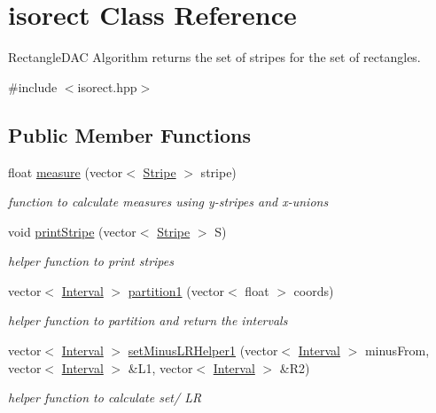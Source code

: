 \hypertarget{classisorect}{}\section{isorect Class Reference}
\label{classisorect}


Rectangle\+D\+AC Algorithm returns the set of stripes for the set of rectangles.  




{\ttfamily \#include $<$isorect.\+hpp$>$}

\subsection*{Public Member Functions}
\begin{DoxyCompactItemize}
\item 
float \hyperlink{classisorect_ae2478502a1adbae4ff7a95c889860b70}{measure} (vector$<$ \hyperlink{classStripe}{Stripe} $>$ stripe)
\begin{DoxyCompactList}\small\item\em function to calculate measures using y-\/stripes and x-\/unions \end{DoxyCompactList}\item 
void \hyperlink{classisorect_abc81549a79ee630c09982f1b560eb644}{print\+Stripe} (vector$<$ \hyperlink{classStripe}{Stripe} $>$ S)
\begin{DoxyCompactList}\small\item\em helper function to print stripes \end{DoxyCompactList}\item 
vector$<$ \hyperlink{classInterval}{Interval} $>$ \hyperlink{classisorect_ab488becc2518f42929ddec2468c60e9e}{partition1} (vector$<$ float $>$ coords)
\begin{DoxyCompactList}\small\item\em helper function to partition and return the intervals \end{DoxyCompactList}\item 
vector$<$ \hyperlink{classInterval}{Interval} $>$ \hyperlink{classisorect_ac0bb316a2ec6e0003ae4f298e789c3f9}{set\+Minus\+L\+R\+Helper1} (vector$<$ \hyperlink{classInterval}{Interval} $>$ minus\+From, vector$<$ \hyperlink{classInterval}{Interval} $>$ \&L1, vector$<$ \hyperlink{classInterval}{Interval} $>$ \&R2)
\begin{DoxyCompactList}\small\item\em helper function to calculate set/ LR \end{DoxyCompactList}\item 

\end{DoxyCompactItemize}
